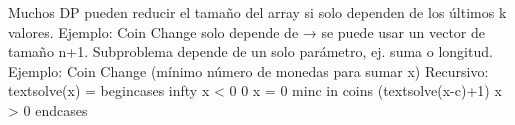 {}\markdownRendererDollarSign{}\markdownRendererDollarSign{}\markdownRendererUlItemEnd 
\markdownRendererUlEndTight \markdownRendererInterblockSeparator
{}
\markdownRendererSectionEnd \markdownRendererSectionBegin
{}\markdownRendererInterblockSeparator
{}\markdownRendererUlBeginTight
\markdownRendererUlItem Muchos DP pueden reducir el tamaño del array si solo dependen de los últimos k valores.\markdownRendererUlItemEnd 
\markdownRendererUlItem Ejemplo: Coin Change solo depende de  → se puede usar un vector de tamaño n+1.\markdownRendererUlItemEnd 
\markdownRendererUlEndTight \markdownRendererInterblockSeparator
{}
\markdownRendererSectionEnd 
\markdownRendererSectionEnd \markdownRendererSectionBegin
{}\markdownRendererInterblockSeparator
{}
\markdownRendererSectionEnd \markdownRendererSectionBegin
{}\markdownRendererInterblockSeparator
{}Subproblema depende de un solo parámetro, ej. suma o longitud.\markdownRendererSoftLineBreak
{}Ejemplo: Coin Change (mínimo número de monedas para sumar x)\markdownRendererParagraphSeparator
{}Recursivo:\markdownRendererSoftLineBreak
{}\markdownRendererDollarSign{}\markdownRendererDollarSign{}\markdownRendererSoftLineBreak
{}\markdownRendererBackslash{}text\markdownRendererLeftBrace{}solve\markdownRendererRightBrace{}(x) =\markdownRendererSoftLineBreak
{}\markdownRendererBackslash{}begin\markdownRendererLeftBrace{}cases\markdownRendererRightBrace{}\markdownRendererSoftLineBreak
{}\markdownRendererBackslash{}infty \markdownRendererAmpersand{} x < 0 \markdownRendererBackslash{}\markdownRendererBackslash{}\markdownRendererSoftLineBreak
{}0 \markdownRendererAmpersand{} x = 0 \markdownRendererBackslash{}\markdownRendererBackslash{}\markdownRendererSoftLineBreak
{}\markdownRendererBackslash{}min\markdownRendererUnderscore{}\markdownRendererLeftBrace{}c \markdownRendererBackslash{}in coins\markdownRendererRightBrace{} (\markdownRendererBackslash{}text\markdownRendererLeftBrace{}solve\markdownRendererRightBrace{}(x-c)+1) \markdownRendererAmpersand{} x > 0\markdownRendererSoftLineBreak
{}\markdownRendererBackslash{}end\markdownRendererLeftBrace{}cases\markdownRendererRightBrace{}\markdownRendererSoftLineBreak
{}\markdownRendererDollarSign{}\markdownRendererDollarSign{}\markdownRendererInterblockSeparator
{}\markdownRendererInterblockSeparator
{}
\markdownRendererSectionEnd 

